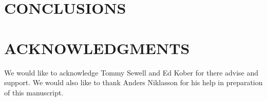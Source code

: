 \documentclass[prb,aps,nobibnotes,twocolumn,doublespace,twocolumngrid,superbib]{revtex4}
\begin{document}
\section{CONCLUSIONS}


\section*{ACKNOWLEDGMENTS}

We would like to acknowledge Tommy Sewell and Ed Kober for there advise
and support. We would also like to thank Anders Niklasson for his help
in preparation of this manuscript. 

 



\eject

\begin{table}
\caption{Comparison \textbf{MondoSCF} and \textbf{Crystal98} for a 
Magnesium Oxide test system. The \textbf{MondoSCF} calculations where done to
the accuracy of the quoted digits. All calculations where done at the Gamma point
for comparison except the last \textbf{Crystal98} calculation, which was done at 
${\bf k}_{max}=\{6,6,6\}$.}
\label{table:ComToCrystal98}
\end{table}
\end{document}
